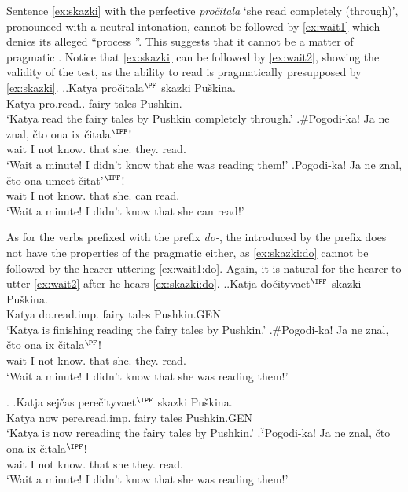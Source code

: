 Sentence \ref{ex:skazki} with the perfective  \textit{pro\v{c}itala} `she read completely (through)', pronounced with a neutral intonation, cannot be followed by \ref{ex:wait1} which denies its alleged ``process ''. This suggests that it cannot be a matter of pragmatic . Notice that \ref{ex:skazki} can be followed by \ref{ex:wait2}, showing the validity of the test, as the ability to read is pragmatically presupposed by \ref{ex:skazki}.
\ex.\ag.\label{ex:skazki}Katya pro\v{c}itala$^{\PF}$ skazki Pu\v{s}kina.\\
Katya pro.read.. {fairy tales} Pushkin.\\
\trans `Katya read the fairy tales by Pushkin completely through.'
\bg.\#Pogodi-ka! Ja ne znal, \v{c}to ona ix \v{c}itala$^{\IPF}$!\label{ex:wait1}\\
wait I not know. that she. they. read.\\
\trans `Wait a minute! I didn't know that she was reading them!'
\bg.\label{ex:wait2}Pogodi-ka! Ja ne znal, \v{c}to ona umeet \v{c}itat'$^{\IPF}$!\\
wait I not know. that she. can read.\\
\trans `Wait a minute! I didn't know that she can read!'


As for the verbs prefixed with the  prefix \textit{do-}, the  introduced by the prefix does not have the properties of the pragmatic  either, as \ref{ex:skazki:do} cannot be followed by the hearer uttering \ref{ex:wait1:do}. Again, it is natural for the hearer to utter \ref{ex:wait2} after he hears \ref{ex:skazki:do}.
\ex.\ag.\label{ex:skazki:do}Katja do\v{c}ityvaet$^{\IPF}$ skazki Pu\v{s}kina.\\
Katya do.read.imp. {fairy tales} Pushkin.{\tiny GEN}\\
\trans `Katya is finishing reading the fairy tales by Pushkin.'
\bg.\#Pogodi-ka! Ja ne znal, \v{c}to ona ix \v{c}itala$^{\PF}$!\label{ex:wait1:do}\\
wait I not know. that she. they. read.\\
\trans `Wait a minute! I didn't know that she was reading them!'

\ex. \label{ex:skazki:pere}\ag.\label{ex:skazki:pere1}Katja sej\v{c}as pere\v{c}ityvaet$^{\IPF}$ skazki Pu\v{s}kina.\\
Katya now pere.read.imp. {fairy tales} Pushkin.{\tiny GEN}\\
\trans `Katya is now rereading the fairy tales by Pushkin.'
\bg.$^?$Pogodi-ka! Ja ne znal, \v{c}to ona ix \v{c}itala$^{\IPF}$!\label{ex:wait1:pere}\\
wait I not know. that she they. read.\\
\trans `Wait a minute! I didn't know that she was reading them!'

